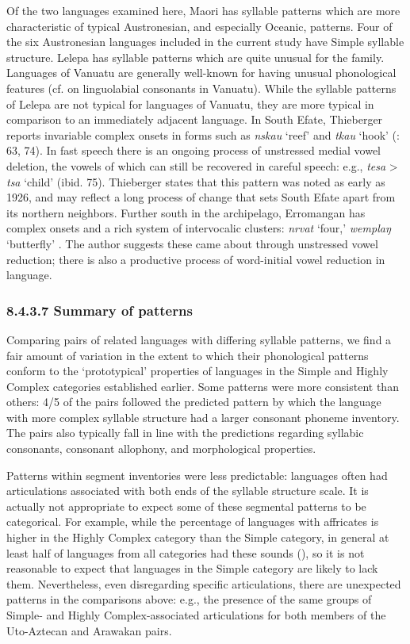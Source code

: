   Of the two languages examined here, Maori has syllable patterns which are more characteristic of typical Austronesian, and especially Oceanic, patterns. Four of the six Austronesian languages included in the current study have Simple syllable structure. Lelepa has syllable patterns which are quite unusual for the family. Languages of Vanuatu are generally well-known for having unusual phonological features (cf. \citealt{Maddieson1989b} on linguolabial consonants in Vanuatu). While the syllable patterns of Lelepa are not typical for languages of Vanuatu, they are more typical in comparison to an immediately adjacent language. In South Efate, Thieberger reports invariable complex onsets in forms such as \textit{nskau} ‘reef’ and \textit{tkau} ‘hook’ (\citealt{Thieberger2004}: 63, 74). In fast speech there is an ongoing process of unstressed medial vowel deletion, the vowels of which can still be recovered in careful speech: e.g., \textit{tesa} > \textit{tsa} ‘child’ (ibid. 75). Thieberger states that this pattern was noted as early as 1926, and may reflect a long process of change that sets South Efate apart from its northern neighbors. Further south in the archipelago, Erromangan has complex onsets and a rich system of intervocalic clusters: \textit{nrvat} ‘four,’ \textit{wemplaŋ} ‘butterfly’ \citep[20-2]{Crowley1998}. The author suggests these came about through unstressed vowel reduction; there is also a productive process of word-initial vowel reduction in language.

\subsubsection{\textbf{8.4.3.7} \textbf{Summary} \textbf{of} \textbf{patterns}}

  Comparing pairs of related languages with differing syllable patterns, we find a fair amount of variation in the extent to which their phonological patterns conform to the ‘prototypical’ properties of languages in the Simple and Highly Complex categories established earlier. Some patterns were more consistent than others: 4/5 of the pairs followed the predicted pattern by which the language with more complex syllable structure had a larger consonant phoneme inventory. The pairs also typically fall in line with the predictions regarding syllabic consonants, consonant allophony, and morphological properties.

  Patterns within segment inventories were less predictable: languages often had articulations associated with both ends of the syllable structure scale. It is actually not appropriate to expect some of these segmental patterns to be categorical. For example, while the percentage of languages with affricates is higher in the Highly Complex category than the Simple category, in general at least half of languages from all categories had these sounds (), so it is not reasonable to expect that languages in the Simple category are likely to lack them. Nevertheless, even disregarding specific articulations, there are unexpected patterns in the comparisons above: e.g., the presence of the same groups of Simple- and Highly Complex-associated articulations for both members of the Uto-Aztecan and Arawakan pairs.

